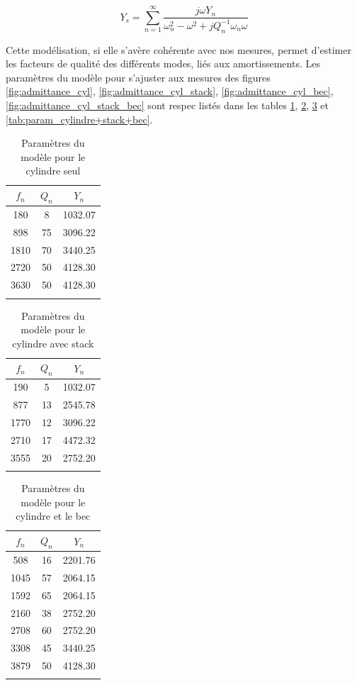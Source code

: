 \documentclass[atiam, article]{rapport} %
\begin{document}
$$
Y_s=\sum_{n=1}^{\infty} \frac{j \omega Y_n}{\omega_n^2-\omega^2+j Q_n^{-1} \omega_n \omega}
$$

Cette modélisation, si elle s'avère cohérente avec nos mesures, permet d'estimer les facteurs de qualité des différents modes, liés aux amortissements. Les paramètres du modèle pour s'ajuster aux mesures des figures \ref{fig:admittance_cyl}, \ref{fig:admittance_cyl_stack}, \ref{fig:admittance_cyl_bec}, \ref{fig:admittance_cyl_stack_bec} sont respec listés dans les tables \ref{tab:param_cylindre}, \ref{tab:param_cylindre+stack}, \ref{tab:param_cylindre+bec} et \ref{tab:param_cylindre+stack+bec}.

\begin{table}[H]
    \centering
    \begin{tabular}{ccc}
\toprule
$f_n$ & $Q_n$ & $Y_n$ \\ \midrule
180 & 8 & 1032.07 \\
898 & 75 & 3096.22 \\
1810 & 70 & 3440.25 \\
2720 & 50 & 4128.30 \\
3630 & 50 & 4128.30 \\
\bottomrule\\
    \end{tabular}
    \caption{Paramètres du modèle pour le cylindre seul}
    \label{tab:param_cylindre}
\end{table}

\begin{table}[H]
    \centering
    \begin{tabular}{ccc}
\toprule
$f_n$ & $Q_n$ & $Y_n$ \\ \midrule
190 & 5 & 1032.07 \\
877 & 13 & 2545.78 \\
1770 & 12 & 3096.22 \\
2710 & 17 & 4472.32 \\
3555 & 20 & 2752.20 \\
\bottomrule\\
    \end{tabular}
    \caption{Paramètres du modèle pour le cylindre avec stack}
    \label{tab:param_cylindre+stack}
\end{table}

\begin{table}[H]
    \centering
    \begin{tabular}{ccc}
\toprule
$f_n$ & $Q_n$ & $Y_n$ \\ \midrule
508 & 16 & 2201.76 \\
1045 & 57 & 2064.15 \\
1592 & 65 & 2064.15 \\
2160 & 38 & 2752.20 \\
2708 & 60 & 2752.20 \\
3308 & 45 & 3440.25 \\
3879 & 50 & 4128.30 \\
\bottomrule\\
    \end{tabular}
    \caption{Paramètres du modèle pour le cylindre et le bec}
    \label{tab:param_cylindre+bec}
\end{table}
\end{document}
